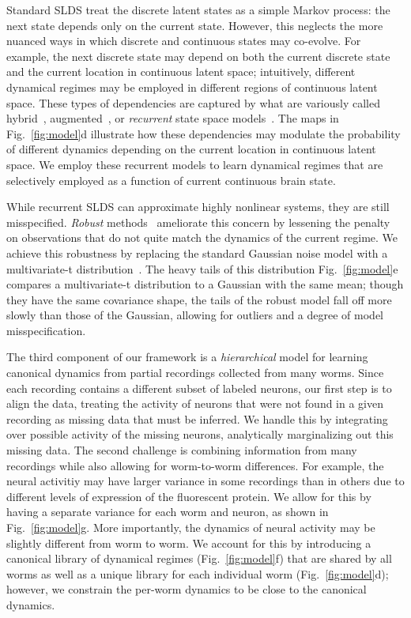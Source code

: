 \documentclass[11pt]{article}
\begin{document}
Standard SLDS treat the discrete latent states as a simple Markov
process: the next state depends only on the current state. However,
this neglects the more nuanced ways in which discrete and continuous
states may co-evolve. For example, the next discrete state may depend
on both the current discrete state and the current location in
continuous latent space; intuitively, different dynamical regimes may
be employed in different regions of continuous latent space. These
types of dependencies are captured by what are variously called
hybrid~\citep{paoletti2007identification},
augmented~\citep{barber2006expectation}, or \emph{recurrent} state
space models~\citep{linderman2017recurrent}. The maps in
Fig.~\ref{fig:model}d illustrate how these dependencies may modulate
the probability of different dynamics depending on the current
location in continuous latent space. We employ these recurrent models
to learn dynamical regimes that are selectively employed as a
function of current continuous brain state.

While recurrent SLDS can approximate highly nonlinear systems, they
are still misspecified. \emph{Robust} methods~\citep{huber1981robust}
ameliorate this concern by lessening the penalty on observations that
do not quite match the dynamics of the current regime.  We achieve
this robustness by replacing the standard Gaussian noise model with a
multivariate-t distribution~\citep{lange1989robust}.  The heavy tails
of this distribution Fig.~\ref{fig:model}e compares a multivariate-t
distribution to a Gaussian with the same mean; though they have
the same covariance shape, the tails of the robust model fall off
more slowly than those of the Gaussian, allowing for outliers and a
degree of model misspecification. 

The third component of our framework is a \emph{hierarchical} model
for learning canonical dynamics from partial recordings collected from
many worms.  Since each recording contains a different subset of
labeled neurons, our first step is to align the data, treating the
activity of neurons that were not found in a given recording as
missing data that must be inferred.  We handle this by integrating
over possible activity of the missing neurons, analytically
marginalizing out this missing data.  The second challenge is
combining information from many recordings while also allowing for
worm-to-worm differences.  For example, the neural activitiy may have
larger variance in some recordings than in others due to different
levels of expression of the fluorescent protein.  We allow for this by
having a separate variance for each worm and neuron, as shown in
Fig.~\ref{fig:model}g.  More importantly, the dynamics of neural
activity may be slightly different from worm to worm.  We account for
this by introducing a canonical library of dynamical regimes
(Fig.~\ref{fig:model}f) that are shared by all worms as well as a
unique library for each individual worm (Fig.~\ref{fig:model}d);
however, we constrain the per-worm dynamics to be close to the
canonical dynamics.
\end{document}
